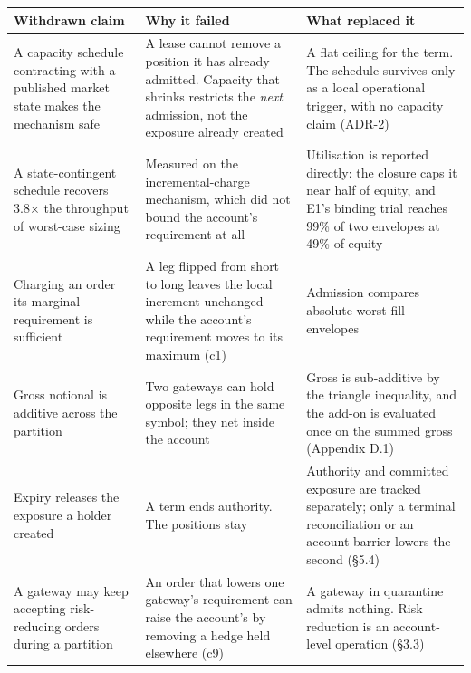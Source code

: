\documentclass[10pt,a4paper]{article}
\newcounter{none}  %
\begin{document}
{\def\LTcaptype{none} %
\begin{longtable}[]{@{}
  >{\raggedright\arraybackslash}p{}
  >{\raggedright\arraybackslash}p{}
  >{\raggedright\arraybackslash}p{}@{}}
\toprule\noalign{}
\begin{minipage}[b]{\linewidth}\raggedright
Withdrawn claim
\end{minipage} & \begin{minipage}[b]{\linewidth}\raggedright
Why it failed
\end{minipage} & \begin{minipage}[b]{\linewidth}\raggedright
What replaced it
\end{minipage} \\
\midrule\noalign{}
\endhead
\bottomrule\noalign{}
\endlastfoot
A capacity schedule contracting with a published market state makes the mechanism safe & A lease cannot remove a position it has already admitted. Capacity that shrinks restricts the \emph{next} admission, not the exposure already created & A flat ceiling for the term. The schedule survives only as a local operational trigger, with no capacity claim (ADR-2) \\
A state-contingent schedule recovers 3.8× the throughput of worst-case sizing & Measured on the incremental-charge mechanism, which did not bound the account's requirement at all & Utilisation is reported directly: the closure caps it near half of equity, and E1's binding trial reaches 99\% of two envelopes at 49\% of equity \\
Charging an order its marginal requirement is sufficient & A leg flipped from short to long leaves the local increment unchanged while the account's requirement moves to its maximum (c1) & Admission compares absolute worst-fill envelopes \\
Gross notional is additive across the partition & Two gateways can hold opposite legs in the same symbol; they net inside the account & Gross is sub-additive by the triangle inequality, and the add-on is evaluated once on the summed gross (Appendix D.1) \\
Expiry releases the exposure a holder created & A term ends authority. The positions stay & Authority and committed exposure are tracked separately; only a terminal reconciliation or an account barrier lowers the second (§5.4) \\
A gateway may keep accepting risk-reducing orders during a partition & An order that lowers one gateway's requirement can raise the account's by removing a hedge held elsewhere (c9) & A gateway in quarantine admits nothing. Risk reduction is an account-level operation (§3.3) \\

\end{longtable}}
\end{document}
